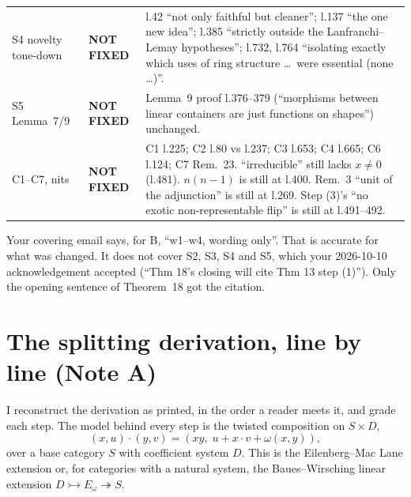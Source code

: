 \documentclass[11pt]{article}
\begin{document}
\begin{longtable}{p{3.0cm}p{2.1cm}p{9.9cm}}
S4 novelty tone-down & \textbf{NOT FIXED} & l.42 ``not only faithful but cleaner''; l.137 ``the one new idea''; l.385 ``strictly outside the Lanfranchi--Lemay hypotheses''; l.732, l.764 ``isolating exactly which uses of ring structure \dots\ were essential (none \dots)''.\\
S5 Lemma~7/9 & \textbf{NOT FIXED} & Lemma~9 proof l.376--379 (``morphisms between linear containers are just functions on shapes'') unchanged.\\
C1--C7, nits & \textbf{NOT FIXED} & C1 l.225; C2 l.80 vs l.237; C3 l.653; C4 l.665; C6 l.124; C7 Rem.~23. ``irreducible'' still lacks $x\neq0$ (l.481). $n(n-1)$ is still at l.400. Rem.~3 ``unit of the adjunction'' is still at l.269. Step (3)'s ``no exotic non-representable flip'' is still at l.491--492.\\
\bottomrule
\end{longtable}
Your covering email says, for B, ``w1--w4, wording only''. That is accurate for what was changed. It
does not cover S2, S3, S4 and S5, which your 2026-10-10 acknowledgement accepted (``Thm 18's closing
will cite Thm 13 step (1)''). Only the opening sentence of Theorem~18 got the citation.

\section{The splitting derivation, line by line (Note A)}
I reconstruct the derivation as printed, in the order a reader meets it, and grade each step. The
model behind every step is the twisted composition on $S\times D$,
\[(x,u)\cdot(y,v)=(xy,\;u+x\!\cdot\!v+\omega(x,y)),\]
over a base category $S$ with coefficient system $D$. This is the Eilenberg--Mac Lane extension
or, for categories with a natural system, the Baues--Wirsching linear extension $D\rightarrowtail
E_\omega\twoheadrightarrow S$.
\end{document}
